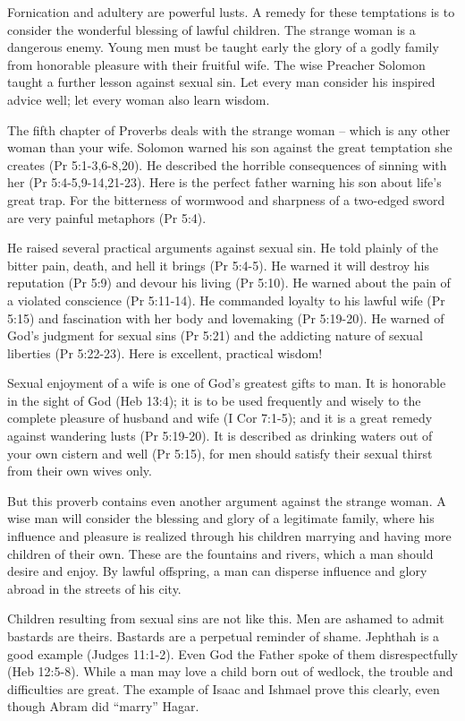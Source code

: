 Fornication and adultery are powerful lusts. A remedy for these temptations is to consider the wonderful blessing of lawful children. The strange woman is a dangerous enemy. Young men must be taught early the glory of a godly family from honorable pleasure with their fruitful wife. The wise Preacher Solomon taught a further lesson against sexual sin. Let every man consider his inspired advice well; let every woman also learn wisdom.

The fifth chapter of Proverbs deals with the strange woman – which is any other woman than your wife. Solomon warned his son against the great temptation she creates (Pr 5:1-3,6-8,20). He described the horrible consequences of sinning with her (Pr 5:4-5,9-14,21-23). Here is the perfect father warning his son about life’s great trap. For the bitterness of wormwood and sharpness of a two-edged sword are very painful metaphors (Pr 5:4).

He raised several practical arguments against sexual sin. He told plainly of the bitter pain, death, and hell it brings (Pr 5:4-5). He warned it will destroy his reputation (Pr 5:9) and devour his living (Pr 5:10). He warned about the pain of a violated conscience (Pr 5:11-14). He commanded loyalty to his lawful wife (Pr 5:15) and fascination with her body and lovemaking (Pr 5:19-20). He warned of God’s judgment for sexual sins (Pr 5:21) and the addicting nature of sexual liberties (Pr 5:22-23). Here is excellent, practical wisdom!

Sexual enjoyment of a wife is one of God’s greatest gifts to man. It is honorable in the sight of God (Heb 13:4); it is to be used frequently and wisely to the complete pleasure of husband and wife (I Cor 7:1-5); and it is a great remedy against wandering lusts (Pr 5:19-20). It is described as drinking waters out of your own cistern and well (Pr 5:15), for men should satisfy their sexual thirst from their own wives only.

But this proverb contains even another argument against the strange woman. A wise man will consider the blessing and glory of a legitimate family, where his influence and pleasure is realized through his children marrying and having more children of their own. These are the fountains and rivers, which a man should desire and enjoy. By lawful offspring, a man can disperse influence and glory abroad in the streets of his city.

Children resulting from sexual sins are not like this. Men are ashamed to admit bastards are theirs. Bastards are a perpetual reminder of shame. Jephthah is a good example (Judges 11:1-2). Even God the Father spoke of them disrespectfully (Heb 12:5-8). While a man may love a child born out of wedlock, the trouble and difficulties are great. The example of Isaac and Ishmael prove this clearly, even though Abram did “marry” Hagar. 

